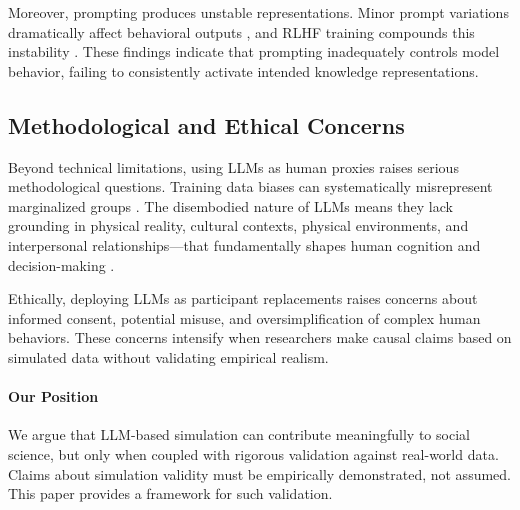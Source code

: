 Moreover, prompting produces unstable representations. Minor prompt variations dramatically affect behavioral outputs \cite{ma2024algorithmic}, and RLHF training compounds this instability \cite{tjuatja2024llms}. These findings indicate that prompting inadequately controls model behavior, failing to consistently activate intended knowledge representations.

\subsection{Methodological and Ethical Concerns}

Beyond technical limitations, using LLMs as human proxies raises serious methodological questions. Training data biases can systematically misrepresent marginalized groups \cite{abid2021persistent, hutchinson2020social}. The disembodied nature of LLMs means they lack grounding in physical reality, cultural contexts, physical environments, and interpersonal relationships—that fundamentally shapes human cognition and decision-making \cite{hussein2012sapir, argyle2023out}.

Ethically, deploying LLMs as participant replacements raises concerns about informed consent, potential misuse, and oversimplification of complex human behaviors. These concerns intensify when researchers make causal claims based on simulated data without validating empirical realism.

\paragraph{Our Position} We argue that LLM-based simulation can contribute meaningfully to social science, but only when coupled with rigorous validation against real-world data. Claims about simulation validity must be empirically demonstrated, not assumed. This paper provides a framework for such validation.
